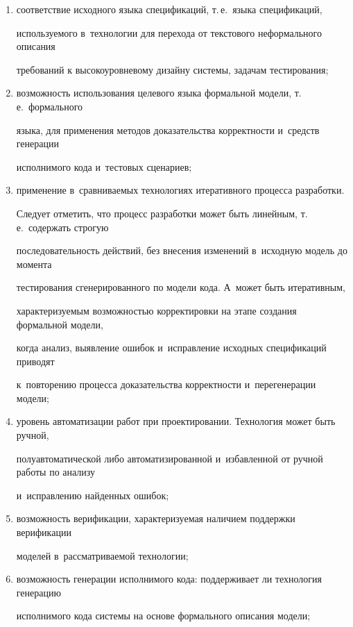   \begin{enumerate}[(1)]

  \item  соответствие исходного языка спецификаций, т.\,е.\ языка спецификаций,

используемого в~технологии для перехода от текстового неформального описания

требований к высокоуровневому дизайну системы, задачам тестирования;

  \item  возможность использования целевого языка формальной модели, т.\,е.\ формального

языка, для применения методов доказательства корректности и~средств генерации

исполнимого кода и~тестовых сценариев;

  \item  применение в~сравниваемых технологиях итеративного процесса разработки.

Следует отметить, что процесс разработки может быть линейным, т.\,е.\ содержать строгую

последовательность действий, без внесения изменений в~исходную модель до момента

тестирования сгенерированного по модели кода. А~может быть итеративным,

характеризуемым возможностью корректировки на этапе создания формальной модели,

когда анализ, выявление ошибок и~исправление исходных спецификаций приводят

к~повторению процесса доказательства корректности и~перегенерации модели;

  \item  уровень автоматизации работ при проектировании. Технология может быть ручной,

полуавтоматической либо автоматизированной и~избавленной от ручной работы по анализу

и~исправлению найденных ошибок;

  \item возможность верификации, характеризуемая наличием поддержки верификации

моделей в~рассматриваемой технологии;

\item возможность генерации исполнимого кода: поддерживает ли технология генерацию

исполнимого кода системы на основе формального описания модели;


\end{enumerate}
